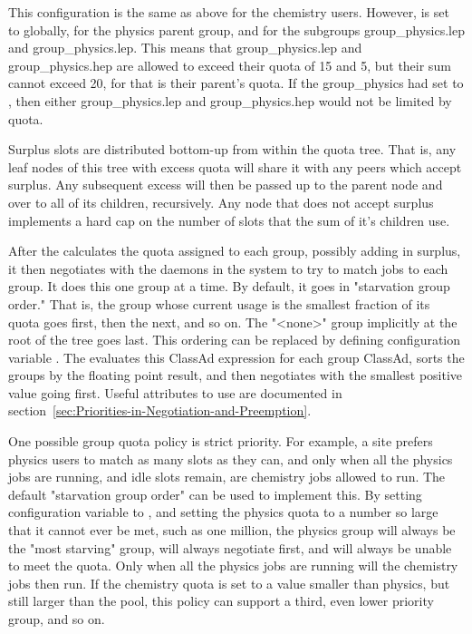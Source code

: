 This configuration is the same as above for the chemistry users.
However,  is set to  globally, 
 for the physics parent group, 
and  for the subgroups group\_physics.lep and group\_physics.lep.
This means that group\_physics.lep and group\_physics.hep
are allowed to exceed their quota of 15 and 5, 
but their sum cannot exceed 20, for that is their parent's quota.
If the group\_physics had  set to ,
then either group\_physics.lep and group\_physics.hep would not 
be limited by quota.  

Surplus slots are distributed bottom-up from within the quota tree.
That is, any leaf nodes of this tree with 
excess quota will share it with any peers which accept surplus. 
Any subsequent excess will then be 
passed up to the parent node and over to all of its children, recursively.
Any node that does not accept surplus implements a hard cap on the 
number of slots that the sum of it's children use.

After the  calculates the quota assigned to each group, 
possibly adding in surplus, 
it then negotiates with the  daemons in the system to 
try to match jobs to each group.
It does this one group at a time.  
By default, it goes in "starvation group order." 
That is, the group whose current usage is the smallest fraction of its
quota goes first, then the next, and so on.  
The "<none>" group implicitly at the root of the tree goes last.
This ordering can be replaced by defining configuration variable
.
The  evaluates this ClassAd expression for each group 
ClassAd, 
sorts the groups by the floating point result, 
and then negotiates with the smallest positive value going first.
Useful attributes to use are documented
in section~\ref{sec:Priorities-in-Negotiation-and-Preemption}.

One possible group quota policy is strict priority.
For example, a site prefers physics users to match as many slots as they can,
and only when all the physics jobs are running, 
and idle slots remain,
are chemistry jobs allowed to run.  
The default "starvation group order" can be used to implement this.  
By setting configuration variable 
 to ,
and setting the physics quota to a number so large that it cannot ever be met,
such as one million, 
the physics group will always be the "most starving" group,
will always negotiate first, 
and will always be unable to meet the quota.  
Only when all the physics jobs are running
will the chemistry jobs then run.  If the chemistry quota is set to a value smaller than physics, but still larger than the
pool, this policy can support a third, even lower priority group, and so on.

